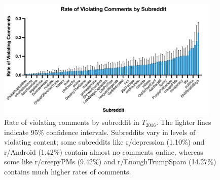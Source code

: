 \begin{figure}[tb]
  \centering
  \includegraphics[width=0.95\textwidth]{content_minor_revision__Apr2022/images/all_rate_of_violating.jpg}
  \caption{Rate of  violating comments by subreddit in $T_{2016}$. The lighter lines indicate 95\% confidence intervals. Subreddits vary in levels of violating content; some subreddits like r/depression (1.10\%) and r/Android (1.42\%) contain almost no   comments online, whereas some like r/creepyPMs (9.42\%) and r/EnoughTrumpSpam (14.27\%) contains much higher rates of  comments.}
\end{figure}
